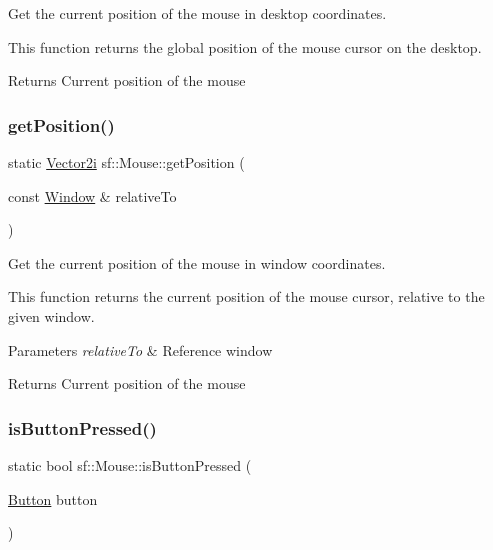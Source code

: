 Get the current position of the mouse in desktop coordinates. 

This function returns the global position of the mouse cursor on the desktop.

\begin{DoxyReturn}{Returns}
Current position of the mouse 
\end{DoxyReturn}
\mbox{\label{classsf_1_1_mouse_a93b4d2ebef728e77a0ec9d83c1e0b0c8}} 
\subsubsection{\texorpdfstring{get\+Position()}{getPosition()}\hspace{0.1cm}{\footnotesize\ttfamily [2/2]}}
{\footnotesize\ttfamily static \hyperlink{classsf_1_1_vector2}{Vector2i} sf\+::\+Mouse\+::get\+Position (\begin{DoxyParamCaption}\item[{const \hyperlink{classsf_1_1_window}{Window} \&}]{relative\+To }\end{DoxyParamCaption})\hspace{0.3cm}{\ttfamily [static]}}



Get the current position of the mouse in window coordinates. 

This function returns the current position of the mouse cursor, relative to the given window.


\begin{DoxyParams}{Parameters}
{\em relative\+To} & Reference window\\
\hline
\end{DoxyParams}
\begin{DoxyReturn}{Returns}
Current position of the mouse 
\end{DoxyReturn}
\mbox{\label{classsf_1_1_mouse_ab647159eb88e369a0332a9c5a7ba6687}} 
\subsubsection{\texorpdfstring{is\+Button\+Pressed()}{isButtonPressed()}}
{\footnotesize\ttfamily static bool sf\+::\+Mouse\+::is\+Button\+Pressed (\begin{DoxyParamCaption}\item[{\hyperlink{classsf_1_1_mouse_a4fb128be433f9aafe66bc0c605daaa90}{Button}}]{button }\end{DoxyParamCaption})\hspace{0.3cm}{\ttfamily [static]}}



